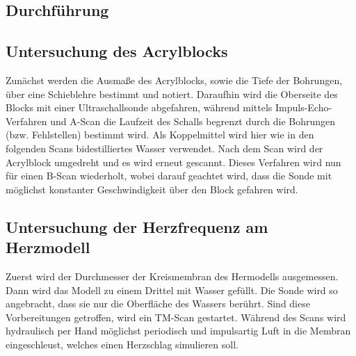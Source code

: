 \subsection{Durchführung}
\label{sec:durchführung}
\subsection{Untersuchung des Acrylblocks}
Zunächst werden die Ausmaße des Acrylblocks, sowie die Tiefe der Bohrungen, über eine Schieblehre bestimmt und notiert.
Daraufhin wird die Oberseite des Blocks mit einer Ultraschallsonde abgefahren, während mittels Impuls-Echo-Verfahren und A-Scan die Laufzeit des Schalls begrenzt durch die Bohrungen (bzw. Fehlstellen) bestimmt wird.
Als Koppelmittel wird hier wie in den folgenden Scans bidestilliertes Wasser verwendet.
Nach dem Scan wird der Acrylblock umgedreht und es wird erneut gescannt.
Dieses Verfahren wird nun für einen B-Scan wiederholt, wobei darauf geachtet wird, dass die Sonde mit möglichst konstanter Geschwindigkeit über den Block gefahren wird.

\subsection{Untersuchung der Herzfrequenz am Herzmodell}
Zuerst wird der Durchmesser der Kreismembran des Hermodells ausgemessen.
Dann wird das Modell zu einem Drittel mit Wasser gefüllt.
Die Sonde wird so angebracht, dass sie nur die Oberfläche des Wassers berührt.
Sind diese Vorbereitungen getroffen, wird ein TM-Scan gestartet.
Während des Scans wird hydraulisch per Hand möglichst periodisch und impulsartig Luft in die Membran eingeschleust, welches einen Herzschlag simulieren soll.
